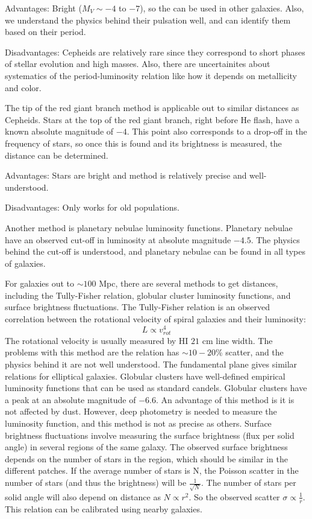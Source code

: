 Advantages:  Bright ($M_V\sim-4$ to $-7$), so the can be used in other galaxies.  
Also, we understand the physics behind their pulsation well, and can identify 
them based on their period.  

Disadvantages:  Cepheids are relatively rare since they correspond to short 
phases of stellar evolution and high masses.  Also, there are uncertainites 
about systematics of the period-luminosity relation like how it depends on 
metallicity and color.  

The tip of the red giant branch method is applicable out to similar distances 
as Cepheids.  Stars at the top of the red giant branch, right before He flash, 
have a known absolute magnitude of $-4$.  This point also corresponds to a 
drop-off in the frequency of stars, so once this is found and its brightness 
is measured, the distance can be determined.  

Advantages: Stars are bright and method is relatively precise and 
well-understood.  

Disadvantages:  Only works for old populations.  

Another method is planetary nebulae luminosity functions.  Planetary nebulae 
have an observed cut-off in luminosity at absolute magnitude $-4.5$.  The 
physics behind the cut-off is understood, and planetary nebulae can be found 
in all types of galaxies.  

For galaxies out to $\sim100$ Mpc, there are several methods to get distances, 
including the Tully-Fisher relation, globular cluster  
luminosity functions, and surface brightness fluctuations.  The Tully-Fisher 
relation is an observed correlation between the rotational velocity of 
spiral galaxies and their luminosity:
\begin{equation}
L\propto v_{rot}^4
\end{equation}
The rotational velocity is usually measured by HI $21$ cm line width.  The 
problems with this method are the relation has $\sim10-20$\% scatter, and 
the physics behind it are not well understood.  The fundamental plane gives 
similar relations for elliptical galaxies.  Globular clusters have well-defined empirical luminosity functions that can be used as 
standard candels.  Globular clusters have a peak at an absolute magnitude 
of $-6.6$.  An advantage of this method is it is not affected by dust.  
However, deep photometry is needed to measure the luminosity function, and 
this method is not as precise as others.  Surface brightness fluctuations 
involve measuring the surface brightness (flux per solid angle) in several 
regions of the same galaxy.  The observed surface brightness depends on the 
number of stars in the region, which should be similar in the different 
patches.  If the average number of stars is N, the Poisson scatter in the 
number of stars (and thus the brightness) will be $\frac{1}{\sqrt{N}}$.  
The number of stars per solid angle will also depend on distance as 
$N\propto r^2$.  So the observed scatter $\sigma\propto\frac{1}{r}$.  This 
relation can be calibrated using nearby galaxies.   

